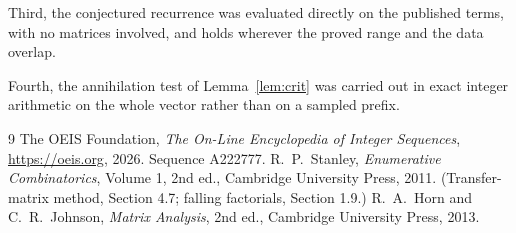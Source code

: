 \documentclass[11pt,a4paper]{article}
\theoremstyle{plain}
\theoremstyle{definition}
\begin{document}
Third, the conjectured recurrence was evaluated directly on the published terms, with no
matrices involved, and holds wherever the proved range and the data overlap.

Fourth, the annihilation test of Lemma~\ref{lem:crit} was carried out in exact integer
arithmetic on the whole vector rather than on a sampled prefix.

\begin{thebibliography}{9}
 The OEIS Foundation, \emph{The On-Line Encyclopedia of Integer
Sequences}, \url{https://oeis.org}, 2026. Sequence A222777.
 R.~P.~Stanley, \emph{Enumerative Combinatorics}, Volume 1, 2nd ed.,
Cambridge University Press, 2011. (Transfer-matrix method, Section 4.7; falling factorials,
Section 1.9.)
 R.~A.~Horn and C.~R.~Johnson, \emph{Matrix Analysis}, 2nd ed., Cambridge
University Press, 2013.
\end{thebibliography}
\end{document}
